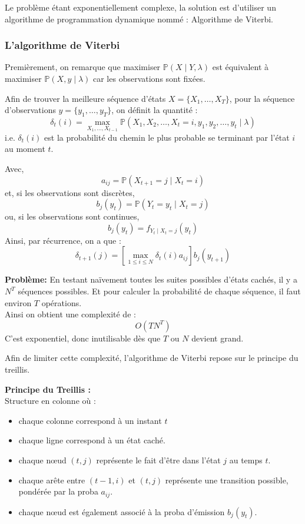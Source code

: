 \documentclass[11pt]{article}
\begin{document}
Le problème étant exponentiellement complexe, la solution est d'utiliser un algorithme de programmation dynamique nommé : Algorithme de Viterbi.

\subsubsection{L'algorithme de Viterbi}

Premièrement, on remarque que maximiser $\mathbb{P}(X \mid Y,\lambda)$ est équivalent à maximiser $\mathbb{P}(X,y \mid \lambda)$ car les observations sont fixées.

Afin de trouver la meilleure séquence d'états $X=\{X_1,\dots,X_T\}$, pour la séquence d'observations $y=\{y_1,\dots,y_T\}$, on définit la quantité :
\[
\delta_t(i)= \max_{X_1,\dots,X_{t-1}} \mathbb{P}(X_1,X_2,\dots,X_t=i,y_1,y_2,\dots,y_t \mid \lambda)
\]
i.e. $\delta_t(i)$ est la probabilité du chemin le plus probable se terminant par l'état $i$ au moment $t$.

\vspace{0.3cm}

Avec,
\[
a_{ij}=\mathbb{P}(X_{t+1}=j \mid X_t=i)
\]
et, si les observations sont discrètes,
\[
b_j(y_t)=\mathbb{P}(Y_t=y_t \mid X_t=j)
\] 
ou, si les observations sont continues, 
\[
b_j(y_t)=f_{Y_t \mid X_t=j}(y_t)
\]
Ainsi, par récurrence, on a que :
\[
\delta_{t+1}(j)=\left[\max_{1\leq i\leq N}\delta_t(i)a_{ij}\right]b_j(y_{t+1})
\]

\textbf{Problème:}
En testant naïvement toutes les suites possibles d'états cachés, il y a $N^T$ séquences possibles.
Et pour calculer la probabilité de chaque séquence, il faut environ $T$ opérations.\\
Ainsi on obtient une complexité de :
\[
O(TN^T)
\]
C'est exponentiel, donc inutilisable dès que $T$ ou $N$ devient grand.

Afin de limiter cette complexité, l'algorithme de Viterbi repose sur le principe du treillis.

\textbf{Principe du Treillis :}\\
Structure en colonne où :
\begin{itemize}
    \item chaque colonne correspond à un instant $t$
    \item chaque ligne correspond à un état caché.
    \item chaque nœud $(t,j)$ représente le fait d'être dans l'état $j$ au temps $t$.
    \item chaque arête entre $(t-1,i)$ et $(t,j)$ représente une transition possible, pondérée par la proba $a_{ij}$.
    \item chaque nœud est également associé à la proba d'émission $b_j(y_t)$.
\end{itemize}
\end{document}
